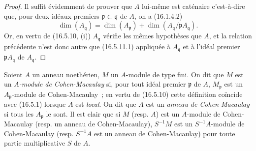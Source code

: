 \begin{proof}
Il suffit évidemment de prouver que $A$ lui-même est caténaire c'est-à-dire
que, pour deux idéaux premiers $\mathfrak{p}\subset\mathfrak{q}$ de $A$, on a
(16.1.4.2)
\[
  \dim(A_{\mathfrak{q}})
  =\dim(A_{\mathfrak{p}})
  +\dim(A_{\mathfrak{q}}/\mathfrak{p}A_{\mathfrak{q}}).
\]
Or, en vertu de (16.5.10, (i)) $A_{\mathfrak{q}}$ vérifie les mêmes
hypothèses que $A$, et la relation précédente n'est donc autre que
(16.5.11.1) appliquée à $A_{\mathfrak{q}}$ et à l'idéal premier
$\mathfrak{p}A_{\mathfrak{q}}$ de $A_{\mathfrak{q}}$.
\end{proof}

\begin{env}[16.5.13]
\label{0.16.5.13-fr}
Soient $A$ un anneau noethérien, $M$ un $A$-module de type fini. On dit que
$M$ est un \emph{$A$-module de Cohen-Macaulay} si, pour tout idéal premier
$\mathfrak{p}$ de $A$, $M_{\mathfrak{p}}$ est un $A_{\mathfrak{p}}$-module
de Cohen-Macaulay~; en vertu de (16.5.10) cette définition coïncide avec
(16.5.1) lorsque $A$ est \emph{local}. On dit que $A$ est un
\emph{anneau de Cohen-Macaulay} si tous les $A_{\mathfrak{p}}$ le sont. Il est
clair que si $M$ (resp. $A$) est un $A$-module de Cohen-Macaulay (resp. un
anneau de Cohen-Macaulay), $S^{-1}M$ est un $S^{-1}A$-module de Cohen-Macaulay
(resp. $S^{-1}A$ est un anneau de Cohen-Macaulay) pour toute partie
multiplicative $S$ de $A$.
\end{env}
